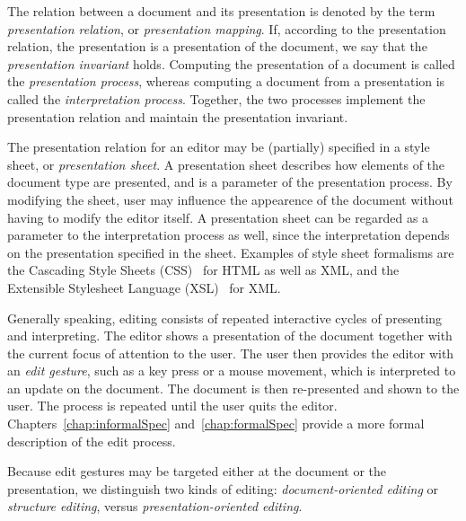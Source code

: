 The relation between a document and its presentation is denoted by the term {\em presentation relation}, or {\em presentation mapping}. If, according to the presentation relation, the presentation is a presentation of the document, we say that the {\em presentation invariant} holds. Computing the presentation of a document is called the {\em presentation process}, whereas computing a document from a presentation is called the {\em interpretation process}. Together, the two processes implement the presentation relation and maintain the presentation invariant.


The presentation relation for an editor may be (partially) specified in a style sheet, or {\em presentation sheet}. A presentation sheet describes how elements of the document type are presented, and is a parameter of the presentation process. By modifying the sheet, user may influence the appearence of the document without having to modify the editor itself. A presentation sheet can be regarded as a parameter to the interpretation process as well, since the interpretation depends on the presentation specified in the sheet. Examples of style sheet formalisms are the Cascading Style Sheets (CSS)~\cite{css2} for HTML as well as XML, and the Extensible Stylesheet Language (XSL)~\cite{xsl10} for XML.

Generally speaking, editing consists of repeated interactive cycles of presenting and interpreting. The editor shows a presentation of the document together with the current focus of attention to the user. The user then provides the editor with an {\em edit gesture}, such as a key press or a mouse movement, which is interpreted to an update on the document. The document is then re-presented and shown to the user. The process is repeated until the user quits the editor. Chapters~\ref{chap:informalSpec} and~\ref{chap:formalSpec} provide a more formal description of the edit process.


Because edit gestures may be targeted either at the document or the presentation, we distinguish two kinds of editing:  {\em document-oriented editing} or {\em structure editing}, versus {\em presentation-oriented editing}.



